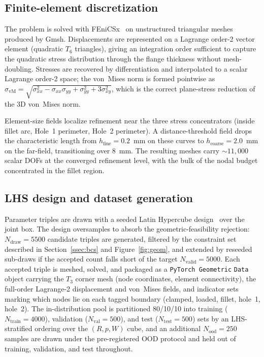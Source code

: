 \documentclass[11pt]{article}
\begin{document}
\subsection{Finite-element discretization}

The problem is solved with FEniCSx~\cite{dokken_fenicsx} on unstructured
triangular meshes produced by Gmsh. Displacements are represented on a
Lagrange order-2 vector element (quadratic $T_6$ triangles), giving an
integration order sufficient to capture the quadratic stress distribution
through the flange thickness without mesh-doubling. Stresses are
recovered by differentiation and interpolated to a scalar Lagrange order-2
space; the von~Mises norm is formed pointwise as
$\sigma_{\mathrm{vM}} =
\sqrt{\sigma_{xx}^2 - \sigma_{xx}\sigma_{yy} + \sigma_{yy}^2
+ 3\sigma_{xy}^2}$, which is the correct plane-stress reduction of the
3D von~Mises norm.

Element-size fields localize refinement near the three stress
concentrators (inside fillet arc, Hole~1 perimeter, Hole~2 perimeter). A
distance-threshold field drops the characteristic length from
$h_{\text{fine}} = 0.2$~mm on these curves to $h_{\text{coarse}} = 2.0$~mm
on the far-field, transitioning over $8$~mm. The resulting meshes carry
$\sim 11{,}000$ scalar DOFs at the converged refinement level, with the
bulk of the nodal budget concentrated in the fillet region.

\subsection{LHS design and dataset generation}
\label{ssec:lhs}

Parameter triples are drawn with a seeded Latin Hypercube
design~\cite{psaros2023uq} over the joint box. The design oversamples to
absorb the geometric-feasibility rejection: $N_{\mathrm{draw}} = 5500$
candidate triples are generated, filtered by the constraint set described
in Section~\ref{ssec:bcs} and Figure~\ref{fig:geom}, and extended by
reseeded sub-draws if the accepted count falls short of the target
$N_{\mathrm{valid}} = 5000$. Each accepted triple is meshed, solved, and
packaged as a \texttt{PyTorch~Geometric} \texttt{Data} object carrying the
$T_3$ corner mesh (node coordinates, element connectivity), the full-order
Lagrange-2 displacement and von~Mises fields, and indicator sets marking
which nodes lie on each tagged boundary (clamped, loaded, fillet, hole~1,
hole~2). The in-distribution pool is partitioned 80/10/10 into training
($N_{\mathrm{train}} = 4000$), validation ($N_{\mathrm{val}} = 500$), and
test ($N_{\mathrm{test}} = 500$) sets by an LHS-stratified ordering over
the $(R, p, W)$ cube, and an additional $N_{\mathrm{ood}} = 250$ samples
are drawn under the pre-registered OOD protocol and held out of training,
validation, and test throughout.
\end{document}
